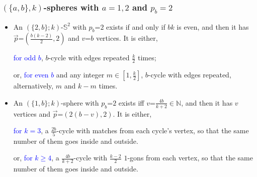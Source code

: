\documentclass{beamer}
\begin{document}
\begin{frame}\frametitle{$(\{a,b\},k)$-spheres with $a=1,2$ and 
$p_b= 2$}
\vspace{-3mm}
\begin{itemize}

\item

An $(\{2,b\};k)$-$\mathbb{S}^2$ with $p_b$=$2$ exists if and only if $bk$ is even, and then it has  
$\vec{p}$=$(\frac{b(k-2)}{2},2)$ and $v$=$b$ vertices. It is either,

\textcolor{blue}{for odd $b$}, $b$-cycle with edges repeated $\frac{k}{2}$ times; 

or, \textcolor{blue}{for even $b$}  and any integer $m\in [1,\frac{k}{2}]$,
$b$-cycle with edges repeated, alternatively, $m$ and $k-m$ times.

 
\item
 An $(\{1,b\};k)$-sphere with $p_b$=$2$ exists iff  $v$=$\frac{4b}{k+2}$$\in $$\mathbb{N}$, and then it has
  $v$ vertices and
$\vec{p}$=$(2(b-v),2)$. It is either,
 

\textcolor{blue}{for $k=3$},  a $\frac{2b}{5}$-cycle with  matches from  each cycle's vertex, 
so that
the same  number of them
goes inside and outside.

or, \textcolor{blue}{for $k\ge 4$},  a $\frac{4b}{k+2}$-cycle with  $\frac{k-2}{2}$ $1$-gons  from each  vertex, so that
the same  number of them
goes inside and outside.



\end{itemize}
\end{frame}
\end{document}
